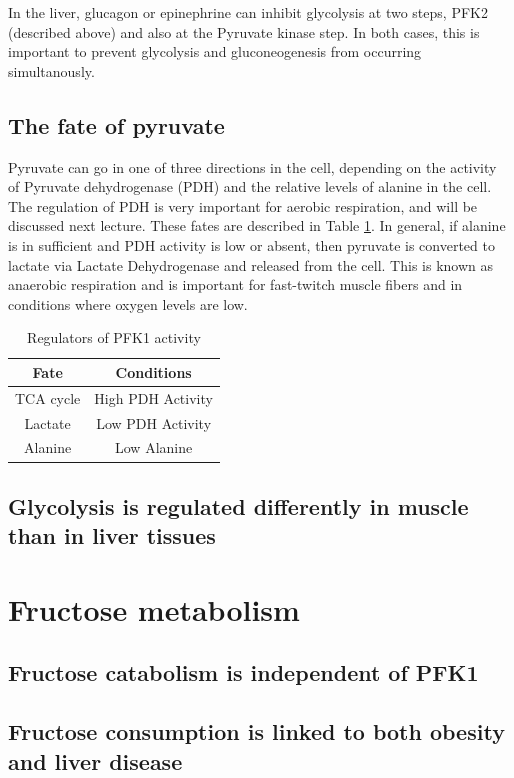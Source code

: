 \documentclass{tufte-handout}
\begin{document}
  In the liver, glucagon or epinephrine can inhibit glycolysis at two steps, PFK2 (described above) and also at the Pyruvate kinase step.  In both cases, this is important to prevent glycolysis and gluconeogenesis from occurring simultanously.

\subsection{The fate of pyruvate}

Pyruvate can go in one of three directions in the cell, depending on the activity of Pyruvate dehydrogenase (PDH) and the relative levels of alanine in the cell.  The regulation of PDH is very important for aerobic respiration, and will be discussed next lecture.  These fates are described in Table \ref{tab:pyruvate-fates}.  In general, if alanine is in sufficient and PDH activity is low or absent, then pyruvate is converted to lactate via Lactate Dehydrogenase and released from the cell.  This is known as anaerobic respiration and is important for fast-twitch muscle fibers and in conditions where oxygen levels are low.

\begin{table}
\centering
\caption{Regulators of PFK1 activity}
\label{tab:pyruvate-fates}
\begin{tabular}{cc}
\hline
\textbf {Fate} & \textbf{Conditions}  \\
\hline
TCA cycle & High PDH Activity \\
Lactate & Low PDH Activity \\
Alanine & Low Alanine \\
\hline
\end{tabular}
\end{table}


\subsection{Glycolysis is regulated differently in muscle than in liver tissues}
\section{Fructose metabolism}
\subsection{Fructose catabolism is independent of PFK1}
\subsection{Fructose consumption is linked to both obesity and liver disease}
\end{document}
